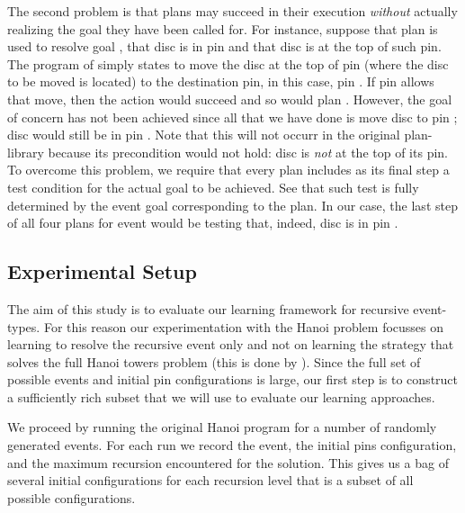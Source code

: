 The second problem is that plans may succeed in their execution \emph{without}
actually realizing the goal they have been called for. For instance, suppose that
plan  is used to resolve goal , that disc
 is in pin  and that disc  is at the top of such
pin. The program of   simply states to move the disc at the
top of pin  (where the disc to be moved is located) to the destination
pin, in this case, pin . If pin  allows that move, then the
action  would succeed and so would plan .
However, the goal of concern has not been achieved since all that we have done is
move disc  to pin ; disc  would still be in pin
. Note that this will not occurr in the original plan-library because
its precondition would not hold: disc  is \emph{not} at the top of its
pin.
To overcome this problem, we require that every plan includes as its final step a
test condition for the actual goal to be achieved. See that such test is fully
determined by the event goal corresponding to the plan. In our case, the last
step of all four plans for event  would be testing that,
indeed, disc  is in pin .

\subsection{Experimental Setup} \label{sec:setup}

The aim of this study is to evaluate our learning framework for recursive event-types. For this reason our experimentation with the Hanoi problem focusses on learning to resolve the recursive event  only and not on learning the strategy that solves the full Hanoi towers problem (this is done by ). Since the full set of possible  events and initial pin configurations is large, our first step is to construct a sufficiently rich subset that we will use to evaluate our learning approaches. 

We proceed by running the original Hanoi program for a number of randomly generated  events. For each run we record the  event, the initial pins configuration, and the maximum recursion encountered for the solution. This gives us a bag of several initial configurations for each recursion level that is a subset of all possible configurations. 


